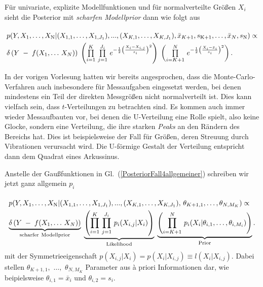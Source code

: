 Für univariate, explizite Modellfunktionen und für normalverteilte Größen $X_i$ sieht die
Posterior mit \textsl{scharfen Modellprior} dann wie folgt aus
\begin{equation}
\arraycolsep=2.0pt\def\arraystretch{2.0}
\begin{array}{l}
p(Y, X_\mathrm{1}, \dots, X_\mathrm{N} | (X_{1,1}, \dots, X_{1,J_1}), ..., (X_{K,1}, \dots, X_{K,J_1}),
 \bar x_{K+1}, s_\mathrm{K+1}, \dots, \bar x_{N}, s_\mathrm{N}) \propto \\
\delta\left(Y \; - \; f(X_1, \dots \, X_N)\right)
\; \left( \prod\limits_{i=1}^K \, \prod\limits_{j=1}^{J_i}  \, 
e^{-\frac{1}{2} \left(\frac{ X_i - X_{i,j} }{s_i} \right)^2} \right)
\;  \left( \prod\limits_{i=K+1}^N \,  e^{-\frac{1}{2} \left(\frac{X_i - \bar x_i}{s_i} \right)^2} \right) .
\end{array}
\label{PosteriorFall4allgemeiner}
\end{equation}


In der vorigen Vorlesung hatten wir bereits angesprochen, dass die Monte-Carlo-Verfahren auch insbesondere
für Messaufgaben eingesetzt werden, bei denen mindestens ein Teil der direkten Messgrößen nicht normalverteilt ist.
Dies kann vielfach sein, dass $t$-Verteilungen zu betrachten sind. Es kommen auch immer wieder Messaufbauten
vor, bei denen die U-Verteilung eine Rolle spielt, also keine Glocke, sondern
eine Verteilung, die ihre starken \textsl{Peaks} an den Rändern des Bereichs hat. Dies ist beispielsweise der
Fall für Größen, deren Streuung durch Vibrationen verursacht wird. Die U-förmige Gestalt der Verteilung entspricht dann
dem Quadrat eines Arkussinus.

Anstelle der Gaußfunktionen in Gl.~(\ref{PosteriorFall4allgemeiner}) schreiben wir jetzt
ganz allgemein $p_i$
\begin{equation}
\arraycolsep=2.0pt\def\arraystretch{2.0}
\begin{array}{l}
p(Y, X_\mathrm{1}, \dots, X_\mathrm{N} | (X_{1,1}, \dots, X_{1,J_1}), ..., (X_{K,1}, \dots, X_{K,J_1}), \,
 \theta_{K+1,1}, \dots, \theta_{N,M_K}) \propto \\
\underbrace{\delta\left(Y \; - \; f(X_1, \dots \, X_N)\right)}_{\mathrm{scharfer~Modellprior}}
\; \underbrace{ \left( \prod\limits_{i=1}^K \, \prod\limits_{j=1}^{J_i}  \, p_i (X_{i,j} | X_i) \right) }_{\mathrm{Likelihood}}
\; \underbrace{ \left( \prod\limits_{i=K+1}^N \,  p_i (X_i | \theta_{i,1}, \dots, \theta_{i,M_i}) \right) }_{\mathrm{Prior}} .
\end{array}
\label{PosteriorFall4p}
\end{equation}
mit der Symmetrieeigenschaft $p(X_{i,j} | X_i) = p(X_i | X_{i,j}) \equiv l(X_i | X_{i,j})$.
Dabei stellen $\theta_{K+1,1},$ $\dots,$ $\theta_{N,M_K}$ Parameter aus {\`a} priori Informationen dar,
wie beipielsweise $\theta_{i,1} = \bar x_i$ und $\theta_{i,2} = s_i$.

